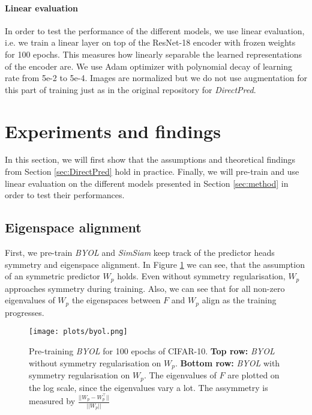 \paragraph{Linear evaluation}
In order to test the performance of the different models, we use linear evaluation, i.e. we train a linear layer on top of the ResNet-18 encoder with frozen weights for 100 epochs. This measures how linearly separable the learned representations of the encoder are. We use Adam optimizer \cite{kingma2014adam} with polynomial decay of learning rate from 5e-2 to 5e-4. Images are normalized but we do not use augmentation for this part of training just as in the original repository for \emph{DirectPred}.  


\section{Experiments and findings}
\label{sec:findings}

In this section, we will first show that the assumptions and theoretical findings from Section \ref{sec:DirectPred} hold in practice. Finally, we will pre-train and use linear evaluation on the different models presented in Section \ref{sec:method} in order to test their performances.

\subsection{Eigenspace alignment}
\label{sec:eig_alignment}
First, we pre-train \emph{BYOL} and \emph{SimSiam} keep track of the predictor heads symmetry and eigenspace alignment. In Figure \ref{fig:BYOL_eig} we can see, that the assumption of an symmetric predictor $W_p$ holds. Even without symmetry regularisation, $W_p$ approaches symmetry during training. Also, we can see that for all non-zero eigenvalues of $W_p$ the eigenspaces between $F$ and $W_p$ align as the training progresses.

\begin{figure}[h]
    \centering
    \texttt{[image: plots/byol.png]}
    \caption{Pre-training \emph{BYOL} for 100 epochs of CIFAR-10. \textbf{Top row:} \emph{BYOL} without symmetry regularisation on $W_p$. \textbf{Bottom row:} \emph{BYOL} with symmetry regularisation on $W_p$. The eigenvalues of $F$ are plotted on the log scale, since the eigenvalues vary a lot. The assymmetry is measured by $\frac{||W_p - W_p^{\top}||}{||W_p||}$}
    \label{fig:BYOL_eig}
\end{figure}

